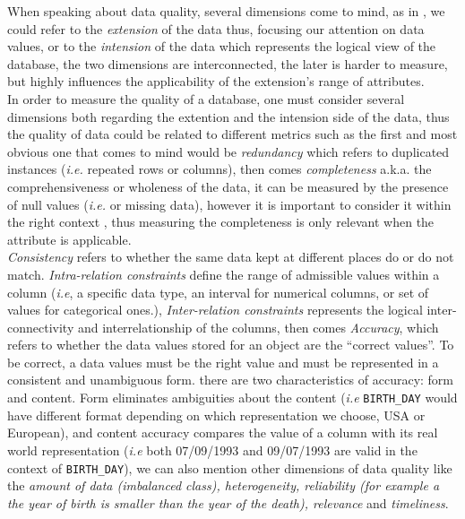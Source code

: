 \documentclass{article}
\begin{document}
When speaking about data quality, several dimensions come to mind, as in \cite{amazon}, we could refer to the \textit{extension} of the data thus, focusing our attention on data values, or to the \textit{intension} of the data which represents the logical view of the database, the two dimensions are interconnected, the later is harder to measure, but highly influences the applicability of the extension's range of attributes.\\
In order to measure the quality of a database, one must consider several dimensions both regarding the extention and the intension side of the data, thus the quality of data could be related to different metrics such as the first and most obvious one that comes to mind would be \textit{redundancy} which refers to duplicated instances (\textit{i.e.} repeated rows or columns), then comes \textit{completeness} a.k.a. the comprehensiveness or wholeness of the data, it can be measured by the presence of null values (\textit{i.e.} or missing data), however it is important to consider it within the right context  \cite{amazon}, thus measuring the completeness is only relevant when the attribute is applicable. \\
\textit{Consistency} refers to whether the same data kept at different places do or do not match. \textit{Intra-relation constraints} define the range of admissible values within a column (\textit{i.e}, a specific data type, an interval for numerical columns, or set of values for categorical ones.), \textit{Inter-relation constraints} represents the logical inter-connectivity and interrelationship of the columns, then comes \textit{Accuracy}, which refers to whether the data values stored for an object are the ``correct values''. To be correct, a data values must be the right value and must be represented in a consistent and unambiguous form. there are two characteristics of accuracy: form and content. Form eliminates ambiguities about the content (\textit{i.e} \texttt{BIRTH\_DAY} would have different format depending on which representation we choose, USA or European), and content accuracy compares the value of a column with its real world representation (\textit{i.e} both 07/09/1993 and 09/07/1993 are valid in the context of \texttt{BIRTH\_DAY}), we can also mention other dimensions of data quality like the \textit{amount of data (imbalanced class), heterogeneity, reliability (for example a the year of birth is smaller than the year of the death), relevance} and \textit{timeliness}. \\
\end{document}
